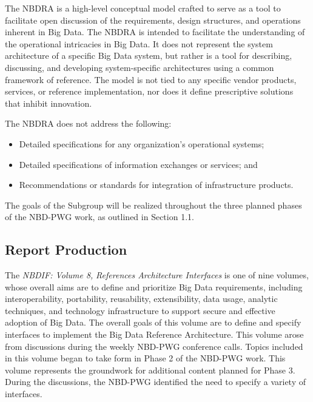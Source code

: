 \documentclass[9pt,]{article}
\providecommand{\tightlist}{%
  \setlength{\itemsep}{0pt}\setlength{\parskip}{0pt}}
\begin{document}
The NBDRA is a high-level conceptual model crafted to serve as a tool to
facilitate open discussion of the requirements, design structures, and
operations inherent in Big Data. The NBDRA is intended to facilitate the
understanding of the operational intricacies in Big Data. It does not
represent the system architecture of a specific Big Data system, but
rather is a tool for describing, discussing, and developing
system-specific architectures using a common framework of reference. The
model is not tied to any specific vendor products, services, or
reference implementation, nor does it define prescriptive solutions that
inhibit innovation.

The NBDRA does not address the following:

\begin{itemize}
\tightlist
\item
  Detailed specifications for any organization's operational systems;
\item
  Detailed specifications of information exchanges or services; and
\item
  Recommendations or standards for integration of infrastructure
  products.
\end{itemize}

The goals of the Subgroup will be realized throughout the three planned
phases of the NBD-PWG work, as outlined in Section 1.1.

\hypertarget{report-production}{%
\subsection{Report Production}\label{report-production}}

The \emph{NBDIF: Volume 8,} \emph{References Architecture Interfaces} is
one of nine volumes, whose overall aims are to define and prioritize Big
Data requirements, including interoperability, portability, reusability,
extensibility, data usage, analytic techniques, and technology
infrastructure to support secure and effective adoption of Big Data. The
overall goals of this volume are to define and specify interfaces to
implement the Big Data Reference Architecture. This volume arose from
discussions during the weekly NBD-PWG conference calls. Topics included
in this volume began to take form in Phase 2 of the NBD-PWG work. This
volume represents the groundwork for additional content planned for
Phase 3. During the discussions, the NBD-PWG identified the need to
specify a variety of interfaces.
\end{document}
